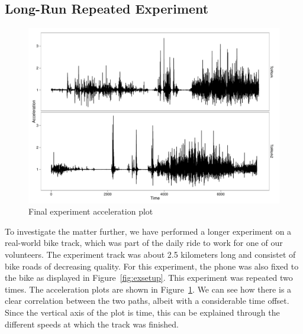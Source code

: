\documentclass[a4paper,11pt]{article}
\begin{document}
\subsection{Long-Run Repeated Experiment}
\begin{figure}
\centering
\includegraphics[width=13cm]{figures/accelerationplot-longtrack}
\caption{Final experiment acceleration plot}
\label{fig:accplotlong}
\end{figure}

To investigate the matter further, we have performed a longer experiment on a real-world bike track, which was part of the daily ride to work for one of our volunteers. The experiment track was about 2.5 kilometers long and consistet of bike roads of decreasing quality. For this experiment, the phone was also fixed to the bike as displayed in Figure~\ref{fig:exsetup}. This experiment was repeated two times. The acceleration plots are shown in Figure~\ref{fig:accplotlong}. We can see how there is a clear correlation between the two paths, albeit with a considerable time offset. Since the vertical axis of the plot is time, this can be explained through the different speeds at which the track was finished. 
\end{document}
